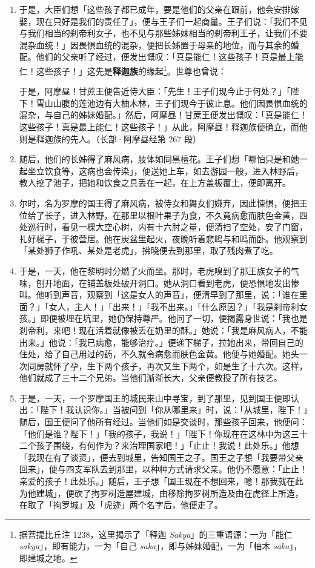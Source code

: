 \begin{enumerate}
\item 于是，大臣们想「这些孩子都已成年，要是他们的父亲在跟前，他会安排嫁娶，现在只好是我们的责任了」，便与王子们一起商量。王子们说：「我们不见与我们相当的刹帝利女子，也不见与那些姊妹相当的刹帝利王子，让我们不要混杂血统！」因畏惧血统的混杂，便把长姊置于母亲的地位，而与其余的婚配。他们的父亲听了经过，便发出慨叹：「真是能仁！这些孩子！真是最上能仁！这些孩子！」这先是\textbf{释迦族}的缘起\footnote{据菩提比丘注 1238，这里揭示了「释迦 \textit{Sakya}」的三重语源：一为「能仁 \textit{sakya}」，即有能力，一为「自己 \textit{saka}」，即与姊妹婚配，一为「柚木 \textit{sāka}」，即建城之地。}。世尊也曾说：\begin{quoting}于是，阿摩昼！甘蔗王便告近侍大臣：「先生！王子们现今止于何处？」「陛下！雪山山腹的莲池边有大柚木林，王子们现今于彼止息。他们因畏惧血统的混杂，与自己的姊妹婚配。」然后，阿摩昼！甘蔗王便发出慨叹：「真是能仁！这些孩子！真是最上能仁！这些孩子！」从此，阿摩昼！释迦族便确立，而他则是释迦族的先人。（长部·阿摩昼经第 267 段）\end{quoting}
\item 随后，他们的长姊得了麻风病，肢体如同黑檀花。王子们想「哪怕只是和她一起坐立饮食等，这病也会传染」，便送她上车，如去游园一般，进入林野后，教人挖了池子，把她和饮食之具丢在一起，在上方盖板覆土，便即离开。
\item 尔时，名为罗摩的国王得了麻风病，被侍女和舞女们嫌弃，因此悚惧，便把王位给了长子，进入林野，在那里以根叶果子为食，不久竟病愈而肤色金黄，四处巡行时，看见一棵大空心树，内有十六肘之量，便清扫了空处，安了门窗，扎好梯子，于彼营居。他在炭盆里起火，夜晚听着悲鸣与和鸣而卧。他观察到「某处狮子作吼、某处是老虎」，拂晓便去到那里，取了残肉煮了吃。
\item 于是，一天，他在黎明时分燃了火而坐。那时，老虎嗅到了那王族女子的气味，刨开地面，在铺盖板处破开洞口。她从洞口看到老虎，便恐惧地发出惨叫。他听到声音，观察到「这是女人的声音」，便清早到了那里，说：「谁在里面？」「女人，主人！」「出来！」「我不出来。」「什么原因？」「我是刹帝利女孩。」即便被埋在坑里，她仍保持尊严。他问了一切，便揭露身世说：「我也是刹帝利，来吧！现在活着就像被丢在奶里的酥。」她说：「我是麻风病人，不能出来。」他说：「我已病愈，能够治疗。」便递下梯子，拉她出来，带回自己的住处，给了自己用过的药，不久就令病愈而肤色金黄。他便与她婚配。她头一次同房就怀了孕，生下两个孩子，再次又生下两个，如是生了十六次。这样，他们就成了三十二个兄弟。当他们渐渐长大，父亲便教授了所有技艺。
\item 于是，一天，一个罗摩国王的城民来山中寻宝，到了那里，见到国王便即认出：「陛下！我认识你。」当被问到「你从哪里来」时，说：「从城里，陛下！」随后，国王便问了他所有经过。当他们如是交谈时，那些孩子回来，他便问：「他们是谁？陛下！」「我的孩子，我说！」「陛下！你现在在这林中为这三十二个孩子围绕，有何作为？来治理国家吧！」「止止！我说！此处乐。」他想「我现在有了谈资」，便去到城里，告知国王之子。国王之子想「我要带父亲回来」，便与四支军队去到那里，以种种方式请求父亲。他仍不愿意：「止止！亲爱的孩子！此处乐。」随后，王子想「国王现在不想回来，噫！那我就在此为他建城」，便砍了拘罗树造屋建城，由移除拘罗树所造及由在虎径上所造，在取了「拘罗城」及「虎迹」两个名字后，他便走了。

\end{enumerate}

